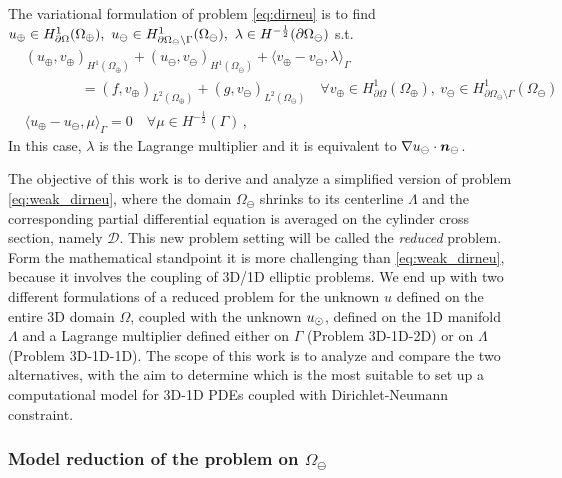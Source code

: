 The variational formulation of problem \eqref{eq:dirneu}
is to find $u_{\oplus} \in H^1_{\partial\Omega}(\Omega_\oplus), \ u_{\ominus} \in H^1_{\partial\Omega_\ominus\setminus\Gamma}(\Omega_\ominus), \ \lambda \in H^{-\frac 1 2}(\partial\Omega_\ominus)$ s.t.
\begin{subequations}\label{eq:weak_dirneu}
\begin{align}
&(u_\oplus,v_\oplus)_{H^1(\Omega_\oplus)} + (u_\ominus,v_\ominus)_{H^1(\Omega_\ominus)} 
+ \langle  v_\oplus - v_\ominus, \lambda \rangle_{\Gamma} 
\\
\nonumber
&\qquad\qquad = (f,v_\oplus)_{L^2(\Omega_\oplus)} + (g,v_\ominus)_{L^2(\Omega_\ominus)}
\quad \forall v_\oplus \in H^1_{\partial\Omega}(\Omega_\oplus), \ v_\ominus \in H^1_{\partial\Omega_\ominus\setminus\Gamma}(\Omega_\ominus)
\\
& \langle u_\oplus - u_\ominus, \mu \rangle_{\Gamma} = 0
\quad \forall  \mu \in H^{-\frac 1 2}(\Gamma)\,,
\end{align}
\end{subequations}
In this case, $\lambda$ is the Lagrange multiplier and it is equivalent to $\nabla u_{\ominus} \cdot \boldsymbol n_\ominus$.

The objective of this work is to derive and analyze a simplified version of problem \eqref{eq:weak_dirneu}, where the domain $\Omega_\ominus$ shrinks to its centerline $\Lambda$ and the corresponding partial differential equation is averaged on the cylinder cross section, namely $\mathcal{D}$. This new problem setting will be called the \emph{reduced} problem. Form the mathematical standpoint it is more challenging than \eqref{eq:weak_dirneu}, because it involves the coupling of 3D/1D elliptic problems.
We end up with two different formulations of a reduced problem for the unknown $u$ defined on the entire 3D domain $\Omega$, 
coupled with the unknown $u_{\odot}$, defined on the 1D manifold $\Lambda$ and a Lagrange multiplier defined either on $\Gamma$ (Problem 3D-1D-2D) or on $\Lambda$ (Problem 3D-1D-1D). 
The scope of this work is to analyze and compare the two alternatives,
with the aim to determine which is the most suitable to set up a computational model for 3D-1D PDEs coupled with Dirichlet-Neumann constraint.


\subsubsection*{Model reduction of the problem on $\Omega_{\ominus}$}

